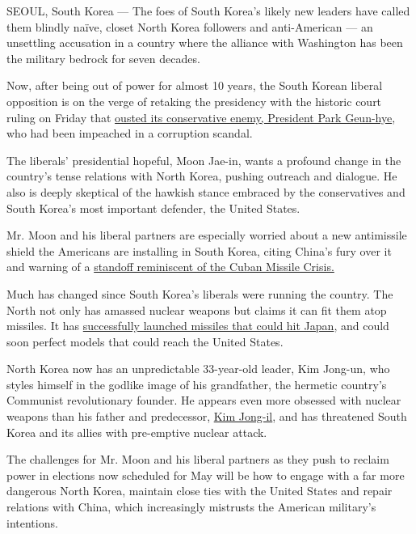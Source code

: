 SEOUL, South Korea --- The foes of South Korea's likely new leaders have
called them blindly naïve, closet North Korea followers and
anti-American --- an unsettling accusation in a country where the
alliance with Washington has been the military bedrock for seven
decades.

Now, after being out of power for almost 10 years, the South Korean
liberal opposition is on the verge of retaking the presidency with the
historic court ruling on Friday that
\href{https://www.nytimes3xbfgragh.onion/2017/03/09/world/asia/park-geun-hye-impeached-south-korea.html}{ousted
its conservative enemy, President Park Geun-hye}, who had been impeached
in a corruption scandal.

The liberals' presidential hopeful, Moon Jae-in, wants a profound change
in the country's tense relations with North Korea, pushing outreach and
dialogue. He also is deeply skeptical of the hawkish stance embraced by
the conservatives and South Korea's most important defender, the United
States.

Mr. Moon and his liberal partners are especially worried about a new
antimissile shield the Americans are installing in South Korea, citing
China's fury over it and warning of a
\href{https://www.nytimes3xbfgragh.onion/2017/03/07/world/asia/korea\%2Dmissile\%2Ddefense\%2Dchina\%2Dtrump.html}{standoff
reminiscent of the Cuban Missile Crisis.}

Much has changed since South Korea's liberals were running the country.
The North not only has amassed nuclear weapons but claims it can fit
them atop missiles. It has
\href{https://www.nytimes3xbfgragh.onion/2017/03/05/world/north-korea-ballistic-missiles.html}{successfully
launched missiles that could hit Japan}, and could soon perfect models
that could reach the United States.

North Korea now has an unpredictable 33-year-old leader, Kim Jong-un,
who styles himself in the godlike image of his grandfather, the hermetic
country's Communist revolutionary founder. He appears even more obsessed
with nuclear weapons than his father and predecessor,
\href{http://www.nytimes3xbfgragh.onion/2011/12/19/world/asia/kim-jong-il-is-dead.html?pagewanted=all}{Kim
Jong-il}, and has threatened South Korea and its allies with pre-emptive
nuclear attack.

The challenges for Mr. Moon and his liberal partners as they push to
reclaim power in elections now scheduled for May will be how to engage
with a far more dangerous North Korea, maintain close ties with the
United States and repair relations with China, which increasingly
mistrusts the American military's intentions.

